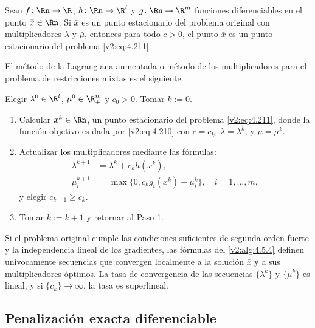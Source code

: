 \begin{theorem}\label{v2:thm:4.5.6}
Sean $f \colon \Rn \to \R$, $h \colon \Rn \to \R^l$ y $g \colon \Rn \to \R^m$ funciones diferenciables en el punto $\bar{x} \in \Rn$. Si $\bar{x}$ es un punto estacionario del problema original con multiplicadores $\bar{\lambda}$ y $\bar{\mu}$, entonces para todo $c > 0$, el punto $\bar{x}$ es un punto estacionario del problema \eqref{v2:eq:4.211}.
\end{theorem}

El método de la Lagrangiana aumentada o método de los multiplicadores para el problema de restricciones mixtas es el siguiente.

\begin{algorithm}\label{v2:alg:4.5.4}
Elegir $\lambda^0 \in \R^l$, $\mu^0 \in \R^m_+$ y $c_0 > 0$. Tomar $k := 0$.
\begin{enumerate}
    \item Calcular $x^k \in \Rn$, un punto estacionario del problema \eqref{v2:eq:4.211}, donde la función objetivo es dada por \eqref{v2:eq:4.210} con $c = c_k$, $\lambda = \lambda^k$, y $\mu = \mu^k$.
    \item Actualizar los multiplicadores mediante las fórmulas:
    \begin{align*}
        \lambda^{k+1} &= \lambda^k + c_k h(x^k), \\
        \mu_i^{k+1} &= \max\{0, c_k g_i(x^k) + \mu_i^k\}, \quad i = 1, \dots, m,
    \end{align*}
    y elegir $c_{k+1} \ge c_k$.
    \item Tomar $k := k + 1$ y retornar al Paso 1.
\end{enumerate}
\end{algorithm}

\begin{theorem}\label{v2:thm:4.5.7}
Si el problema original cumple las condiciones suficientes de segunda orden fuerte y la independencia lineal de los gradientes, las fórmulas del \cref{v2:alg:4.5.4} definen unívocamente secuencias que convergen localmente a la solución $\bar{x}$ y a sus multiplicadores óptimos. La tasa de convergencia de las secuencias $\{\lambda^k\}$ y $\{\mu^k\}$ es lineal, y si $\{c_k\} \to \infty$, la tasa es superlineal.
\end{theorem}

\subsection{Penalización exacta diferenciable}\label{v2:sec:4.5.5}

